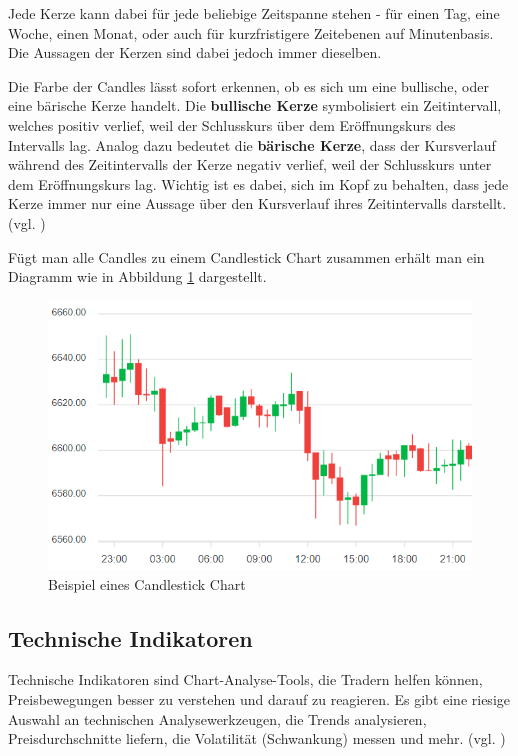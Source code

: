 \documentclass[oneside]{ausarbeitung}
\begin{document}
Jede Kerze kann dabei für jede beliebige Zeitspanne stehen - für
einen Tag, eine Woche, einen Monat, oder auch für kurzfristigere
Zeitebenen auf Minutenbasis. Die Aussagen der Kerzen sind dabei jedoch
immer dieselben.

Die Farbe der Candles lässt sofort erkennen, ob es sich um eine
bullische, oder eine bärische Kerze handelt. Die \textbf{bullische
Kerze} symbolisiert ein Zeitintervall, welches positiv verlief, weil
der Schlusskurs über dem Eröffnungskurs des Intervalls lag. Analog
dazu bedeutet die \textbf{bärische Kerze}, dass der Kursverlauf
während des Zeitintervalls der Kerze negativ verlief, weil der
Schlusskurs unter dem Eröffnungskurs lag. Wichtig ist es dabei, sich
im Kopf zu behalten, dass jede Kerze immer nur eine Aussage über den
Kursverlauf ihres Zeitintervalls darstellt. (vgl.
\cite{candles_explained})
 
Fügt man alle Candles zu einem Candlestick Chart zusammen erhält man
ein Diagramm wie in Abbildung \ref{fig:2} dargestellt. \\

\begin{figure}[H]
  \centering
  \includegraphics[height=0.43\textheight]{img/candlestick_chart.png}
  \caption{Beispiel eines Candlestick Chart\cite{candlestick_chart_pic}}
  \label{fig:2}
\end{figure}

\subsection{Technische Indikatoren}
\label{sub:technische_Indikatoren}

Technische Indikatoren sind Chart-Analyse-Tools, die Tradern helfen
können, Preisbewegungen besser zu verstehen und darauf zu reagieren.
Es gibt eine riesige Auswahl an technischen Analysewerkzeugen, die
Trends analysieren, Preisdurchschnitte liefern, die Volatilität
(Schwankung) messen und mehr. (vgl. \cite{technical_indicators})
\end{document}
